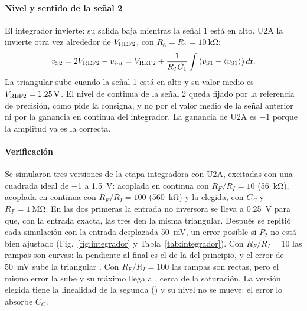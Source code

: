 \paragraph*{Nivel y sentido de la señal 2} El integrador invierte: su salida baja mientras la señal 1 está en alto. U2A la invierte otra vez alrededor de $V_{\mathrm{REF2}}$, con $R_6 = R_7 = \SI{10}{\kilo\ohm}$:
\begin{equation}
v_{\mathrm{S2}} = 2V_{\mathrm{REF2}} - v_{int} = V_{\mathrm{REF2}} + \frac{1}{R_I C_1}\int \left(v_{\mathrm{S1}} - \langle v_{\mathrm{S1}} \rangle\right) dt.
\end{equation}
La triangular sube cuando la señal 1 está en alto y su valor medio es $V_{\mathrm{REF2}} = \SI{1,25}{\volt}$. El nivel de continua de la señal 2 queda fijado por la referencia de precisión, como pide la consigna, y no por el valor medio de la señal anterior ni por la ganancia en continua del integrador. La ganancia de U2A es $-1$ porque la amplitud ya es la correcta.

\paragraph*{Verificación} Se simularon tres versiones de la etapa integradora con U2A, excitadas con una cuadrada ideal de \SI{-1}{} a \SI{1,5}{\volt}: acoplada en continua con $R_F/R_I = 10$ (\SI{56}{\kilo\ohm}), acoplada en continua con $R_F/R_I = 100$ (\SI{560}{\kilo\ohm}) y la elegida, con $C_C$ y $R_F = \SI{1}{\mega\ohm}$. En las dos primeras la entrada no inversora se lleva a \SI{0,25}{\volt} para que, con la entrada exacta, las tres den la misma triangular. Después se repitió cada simulación con la entrada desplazada \SI{50}{\milli\volt}, un error posible si $P_2$ no está bien ajustado (Fig.~\ref{fig:integrador} y Tabla~\ref{tab:integrador}). Con $R_F/R_I = 10$ las rampas son curvas: la pendiente al final es el  de la del principio, y el error de \SI{50}{\milli\volt} sube la triangular . Con $R_F/R_I = 100$ las rampas son rectas, pero el mismo error la sube  y su máximo llega a , cerca de la saturación. La versión elegida tiene la linealidad de la segunda () y su nivel no se mueve: el error lo absorbe $C_C$.

